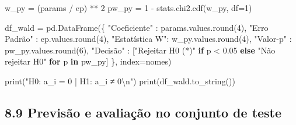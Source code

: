 \documentclass[
  letterpaper,
  DIV=11,
  numbers=noendperiod]{scrartcl}
\newenvironment{Shaded}{\begin{snugshade}}{\end{snugshade}}
\newcommand{\BuiltInTok}[1]{\textcolor[rgb]{0.00,0.23,0.31}{#1}}
\newcommand{\CharTok}[1]{\textcolor[rgb]{0.13,0.47,0.30}{#1}}
\newcommand{\ControlFlowTok}[1]{\textcolor[rgb]{0.00,0.23,0.31}{\textbf{#1}}}
\newcommand{\DecValTok}[1]{\textcolor[rgb]{0.68,0.00,0.00}{#1}}
\newcommand{\FloatTok}[1]{\textcolor[rgb]{0.68,0.00,0.00}{#1}}
\newcommand{\KeywordTok}[1]{\textcolor[rgb]{0.00,0.23,0.31}{\textbf{#1}}}
\newcommand{\NormalTok}[1]{\textcolor[rgb]{0.00,0.23,0.31}{#1}}
\newcommand{\OperatorTok}[1]{\textcolor[rgb]{0.37,0.37,0.37}{#1}}
\newcommand{\StringTok}[1]{\textcolor[rgb]{0.13,0.47,0.30}{#1}}
\begin{document}
\begin{Shaded}
\begin{Highlighting}[]
\NormalTok{w\_py  }\OperatorTok{=}\NormalTok{ (params }\OperatorTok{/}\NormalTok{ ep) }\OperatorTok{**} \DecValTok{2}
\NormalTok{pw\_py }\OperatorTok{=} \DecValTok{1} \OperatorTok{{-}}\NormalTok{ stats.chi2.cdf(w\_py, df}\OperatorTok{=}\DecValTok{1}\NormalTok{)}

\NormalTok{df\_wald }\OperatorTok{=}\NormalTok{ pd.DataFrame(\{}
    \StringTok{"Coeficiente"}\NormalTok{  : params.values.}\BuiltInTok{round}\NormalTok{(}\DecValTok{4}\NormalTok{),}
    \StringTok{"Erro Padrão"}\NormalTok{  : ep.values.}\BuiltInTok{round}\NormalTok{(}\DecValTok{4}\NormalTok{),}
    \StringTok{"Estatística W"}\NormalTok{: w\_py.values.}\BuiltInTok{round}\NormalTok{(}\DecValTok{4}\NormalTok{),}
    \StringTok{"Valor{-}p"}\NormalTok{      : pw\_py.values.}\BuiltInTok{round}\NormalTok{(}\DecValTok{6}\NormalTok{),}
    \StringTok{"Decisão"}\NormalTok{      : [}\StringTok{"Rejeitar H0 (*)"} \ControlFlowTok{if}\NormalTok{ p }\OperatorTok{\textless{}} \FloatTok{0.05} \ControlFlowTok{else} \StringTok{"Não rejeitar H0"}
                      \ControlFlowTok{for}\NormalTok{ p }\KeywordTok{in}\NormalTok{ pw\_py]}
\NormalTok{\}, index}\OperatorTok{=}\NormalTok{nomes)}

\BuiltInTok{print}\NormalTok{(}\StringTok{"H0: a\_i = 0  |  H1: a\_i ≠ 0}\CharTok{\textbackslash{}n}\StringTok{"}\NormalTok{)}
\BuiltInTok{print}\NormalTok{(df\_wald.to\_string())}
\end{Highlighting}
\end{Shaded}

\subsection{8.9 Previsão e avaliação no conjunto de
teste}\label{previsuxe3o-e-avaliauxe7uxe3o-no-conjunto-de-teste-1}
\end{document}

